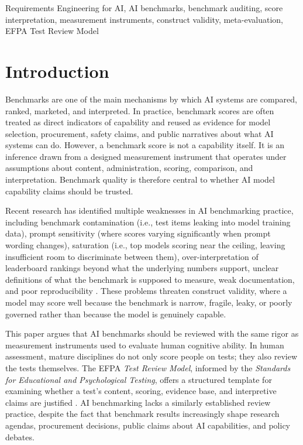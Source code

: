 \documentclass[conference]{IEEEtran}
\begin{document}
\begin{IEEEkeywords}
Requirements Engineering for AI, AI benchmarks, benchmark auditing, score interpretation, measurement instruments, construct validity, meta-evaluation, EFPA Test Review Model
\end{IEEEkeywords}

\section{Introduction}

    Benchmarks are one of the main mechanisms by which AI systems are compared, ranked, marketed, and interpreted. In practice, benchmark scores are often treated as direct indicators of capability and reused as evidence for model selection, procurement, safety claims, and public narratives about what AI systems can do. However, a benchmark score is not a capability itself. It is an inference drawn from a designed measurement instrument that operates under assumptions about content, administration, scoring, comparison, and interpretation. Benchmark quality is therefore central to whether AI model capability claims should be trusted.
    
    Recent research has identified multiple weaknesses in AI benchmarking practice, including benchmark contamination (i.e., test items leaking into model training data), prompt sensitivity (where scores varying significantly when prompt wording changes), saturation (i.e., top models scoring near the ceiling, leaving insufficient room to discriminate between them), over-interpretation of leaderboard rankings beyond what the underlying numbers support, unclear definitions of what the benchmark is supposed to measure, weak documentation, and poor reproducibility \cite{jo_wilson_what_does_your_benchmark_measure}. These problems threaten construct validity, where a model may score well because the benchmark is narrow, fragile, leaky, or poorly governed rather than because the model is genuinely capable.
    
    This paper argues that AI benchmarks should be reviewed with the same rigor as measurement instruments used to evaluate human cognitive ability. In human assessment, mature disciplines do not only score people on tests; they also review the tests themselves. The EFPA \textit{Test Review Model}, informed by the \textit{Standards for Educational and Psychological Testing}, offers a structured template for examining whether a test's content, scoring, evidence base, and interpretive claims are justified \cite{aera_apa_ncme_standards_2014,efpa_test_review_model_2025}. AI benchmarking lacks a similarly established review practice, despite the fact that benchmark results increasingly shape research agendas, procurement decisions, public claims about AI capabilities, and policy debates.
    
\end{document}
